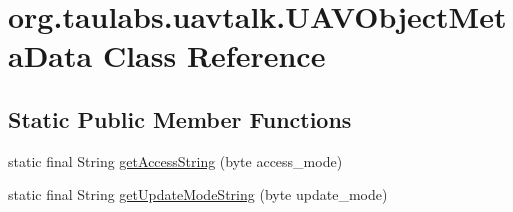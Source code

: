 \hypertarget{classorg_1_1taulabs_1_1uavtalk_1_1_u_a_v_object_meta_data}{\section{org.\-taulabs.\-uavtalk.\-U\-A\-V\-Object\-Meta\-Data \-Class \-Reference}
\label{classorg_1_1taulabs_1_1uavtalk_1_1_u_a_v_object_meta_data}
}
\subsection*{\-Static \-Public \-Member \-Functions}
\begin{DoxyCompactItemize}
\item 
static final \-String \hyperlink{classorg_1_1taulabs_1_1uavtalk_1_1_u_a_v_object_meta_data_a47f45bc1a914bbd723945b42072b0dd7}{get\-Access\-String} (byte access\-\_\-mode)
\item 
static final \-String \hyperlink{classorg_1_1taulabs_1_1uavtalk_1_1_u_a_v_object_meta_data_ae9dd149aba48b4eeccb01f184879074d}{get\-Update\-Mode\-String} (byte update\-\_\-mode)
\end{DoxyCompactItemize}
